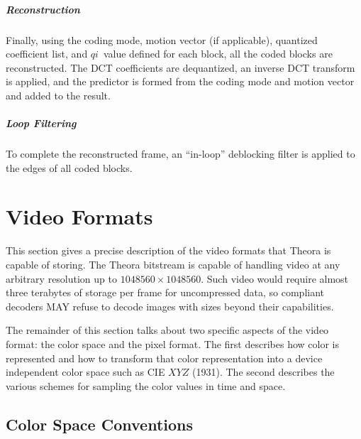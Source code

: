 \documentclass[11pt,letterpaper]{book}
\newcommand{\idx}[1]{{\ensuremath{\mathit{#1}}}}
\newcommand{\qi}{\idx{qi}}
\numberwithin{equation}{chapter}
\numberwithin{figure}{chapter}
\numberwithin{table}{chapter}
\begin{document}
\paragraph{Reconstruction}

Finally, using the coding mode, motion vector (if applicable), quantized
 coefficient list, and \qi\ value defined for each block, all the coded blocks
 are reconstructed.
The DCT coefficients are dequantized, an inverse DCT transform is applied, and
 the predictor is formed from the coding mode and motion vector and added to
 the result.

\paragraph{Loop Filtering}

To complete the reconstructed frame, an ``in-loop'' deblocking filter is applied to the edges of all coded blocks.


\chapter{Video Formats}

This section gives a precise description of the video formats that Theora is
 capable of storing.
The Theora bitstream is capable of handling video at any arbitrary resolution
 up to $1048560\times 1048560$.
Such video would require almost three terabytes of storage per frame for
 uncompressed data, so compliant decoders MAY refuse to decode images with
 sizes beyond their capabilities.

The remainder of this section talks about two specific aspects of the video
 format: the color space and the pixel format.
The first describes how color is represented and how to transform that color
 representation into a device independent color space such as CIE $XYZ$ (1931).
The second describes the various schemes for sampling the color values in time
 and space.

\section{Color Space Conventions}
\end{document}
